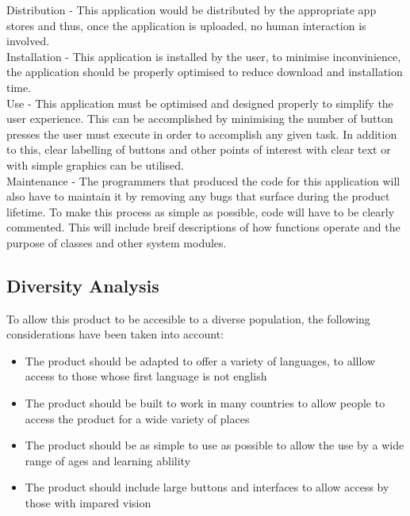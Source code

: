 \documentclass[paper=a4, fontsize=12pt]{scrartcl} %
\numberwithin{equation}{section} %
\numberwithin{figure}{section} %
\numberwithin{table}{section} %
\begin{document}
            Distribution - This application would be distributed by the appropriate app stores and thus, once the application is uploaded, no human interaction is involved.\\

            Installation - This application is installed by the user, to minimise inconvinience, the application should be properly optimised to reduce download and installation time.\\

            Use - This application must be optimised and designed properly to simplify the user experience. This can be accomplished by minimising the number of button presses the user must execute in order to accomplish any given task. In addition to this, clear labelling of buttons and other points of interest with clear text or with simple graphics can be utilised.\\

            Maintenance - The programmers that produced the code for this application will also have to maintain it by removing any bugs that surface during the product lifetime. To make this process as simple as possible, code will have to be clearly commented. This will include breif descriptions of how functions operate and the purpose of classes and other system modules.

        \subsection{Diversity Analysis}

            To allow this product to be accesible to a diverse population, the following considerations have been taken into account:

            \begin{itemize}
                \item The product should be adapted to offer a variety of languages, to alllow access to those whose first language is not english

                \item The product should be built to work in many countries to allow people to access the product for a wide variety of places

                \item The product should be as simple to use as possible to allow the use by a wide range of ages and learning ablility

                \item The product should include large buttons and interfaces to allow access by those with impared vision
            \end{itemize}
\end{document}

